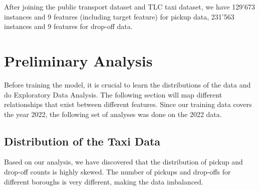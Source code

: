 \documentclass[11pt]{article}
\begin{document}
After joining the public transport dataset and TLC taxi dataset, we have 129'673 instances and 9 features (including target feature) for pickup data, 231'563 instances and 9 features for drop-off data. 

\section{Preliminary Analysis}

Before training the model, it is crucial to learn the distributions of the data and do Exploratory Data Analysis. The following section will map different relationships that exist between different features. Since our training data covers the year 2022, the following set of analyses was done on the 2022 data.

\subsection{Distribution of the Taxi Data}

Based on our analysis, we have discovered that the distribution of pickup and drop-off counts is highly skewed. The number of pickups and drop-offs for different boroughs is very different, making the data imbalanced. 
\end{document}
